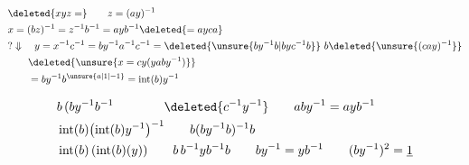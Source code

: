 \[
\begin{aligned}
&\deleted{xyz=}\qquad z=(ay)^{-1}\\
&x=(bz)^{-1}=z^{-1}b^{-1}=ayb^{-1}\deleted{=ayca}\\
&?\Downarrow\quad y=x^{-1}c^{-1}=by^{-1}a^{-1}c^{-1}
=\deleted{\unsure{by^{-1}b|byc^{-1}b}}\ b\deleted{\unsure{(cay)^{-1}}}\\
&\qquad\deleted{\unsure{x=cy(yaby^{-1})}}\\
&\qquad=by^{-1}b^{\unsure{a|1|-1}}=\operatorname{int}(b)y^{-1}
\end{aligned}
\]

\[
\begin{aligned}
&b\,(by^{-1}b^{-1}\qquad\qquad \deleted{c^{-1}y^{-1}}\qquad aby^{-1}=ayb^{-1}\\
&\operatorname{int}(b)\bigl(\operatorname{int}(b)y^{-1}\bigr)^{-1}
\qquad b(by^{-1}b)^{-1}b\\
&\operatorname{int}(b)\,(\operatorname{int}(b)(y))\qquad
b\,b^{-1}yb^{-1}b\qquad by^{-1}=yb^{-1}\qquad (by^{-1})^2=\underline{1}
\end{aligned}
\]

